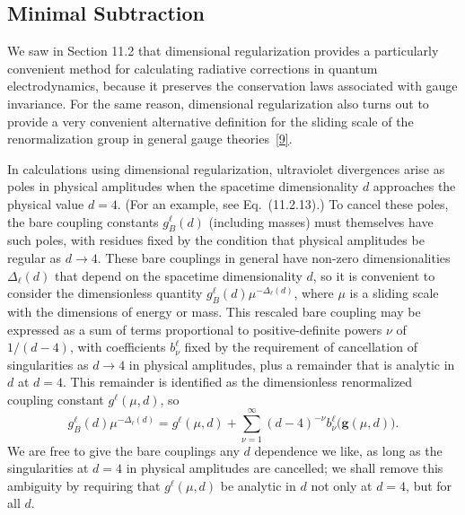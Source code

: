 
\subsection{Minimal Subtraction}
\label{sec:18.6}

We saw in Section 11.2 that dimensional regularization provides a particularly convenient method for calculating radiative corrections in quantum electrodynamics, because it preserves the conservation laws associated with gauge invariance. For the same reason, dimensional regularization also turns out to provide a very convenient alternative definition for the sliding scale of the renormalization group in general gauge theories~\hyperref[ch18-ref-9]{[9]}.

In calculations using dimensional regularization, ultraviolet divergences arise as poles in physical amplitudes when the spacetime dimensionality $d$ approaches the physical value $d=4$. (For an example, see Eq.~(11.2.13).) To cancel these poles, the bare coupling constants $g_B^\ell(d)$ (including masses) must themselves have such poles, with residues fixed by the condition that physical amplitudes be regular as $d\to4$. These bare couplings in general have non-zero dimensionalities $\Delta_\ell(d)$ that depend on the spacetime dimensionality $d$, so it is convenient to consider the dimensionless quantity $g_B^\ell(d)\mu^{-\Delta_\ell(d)}$, where $\mu$ is a sliding scale with the dimensions of energy or mass. This rescaled bare coupling may be expressed as a sum of terms proportional to positive-definite powers $\nu$ of $1/(d-4)$, with coefficients $b_\nu^\ell$ fixed by the requirement of cancellation of singularities as $d\to4$ in physical amplitudes, plus a remainder that is analytic in $d$ at $d=4$. This remainder is identified as the dimensionless renormalized coupling constant $g^\ell(\mu,d)$, so
\begin{equation}
g_B^\ell(d)\mu^{-\Delta_\ell(d)}
=g^\ell(\mu,d)+\sum_{\nu=1}^{\infty}(d-4)^{-\nu}
b_\nu^\ell\bigl(\mathbf{g}(\mu,d)\bigr).
\tag{18.6.1}\label{eq:18.6.1}
\end{equation}
We are free to give the bare couplings any $d$ dependence we like, as long as the singularities at $d=4$ in physical amplitudes are cancelled; we shall remove this ambiguity by requiring that $g^\ell(\mu,d)$ be analytic in $d$ not only at $d=4$, but for all $d$.

